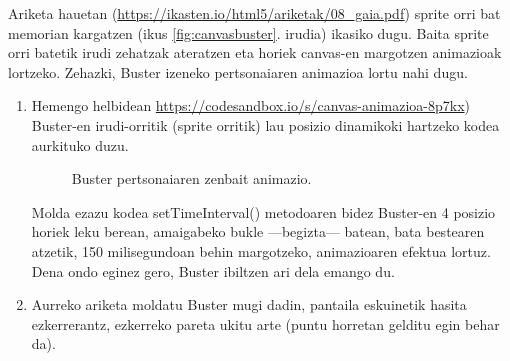 Ariketa hauetan (\href{https://ikasten.io/html5/ariketak/08_gaia.pdf}{https://ikasten.io/html5/ariketak/08\_gaia.pdf}) sprite orri bat memorian kargatzen (ikus \ref{fig:canvasbuster}. irudia) ikasiko dugu. Baita sprite orri batetik irudi zehatzak ateratzen eta horiek canvas-en margotzen animazioak lortzeko. Zehazki,  Buster izeneko pertsonaiaren animazioa lortu nahi dugu.
\begin{enumerate}
    \item Hemengo helbidean \href{https://codesandbox.io/s/canvas-animazioa-8p7kx}{https://codesandbox.io/s/canvas-animazioa-8p7kx}) Buster-en irudi-orritik
(sprite orritik) lau posizio dinamikoki hartzeko kodea aurkituko duzu.

\begin{figure}[ht]
	\centering
{}
\caption{Buster pertsonaiaren zenbait animazio.}
\label{fig:playerbuster}
\end{figure}

Molda ezazu kodea setTimeInterval() metodoaren bidez Buster-en 4 posizio horiek leku berean,
amaigabeko bukle —begizta— batean, bata bestearen atzetik, 150 milisegundoan behin margotzeko,
animazioaren efektua lortuz. Dena ondo eginez gero, Buster ibiltzen ari dela emango du.

\item Aurreko ariketa moldatu Buster mugi dadin, pantaila eskuinetik hasita ezkerrerantz, ezkerreko
pareta ukitu arte (puntu horretan gelditu egin behar da).

\end{enumerate}